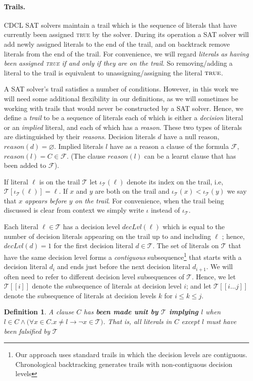 \documentclass[runningheads]{llncs}
\newcommand{\sat}{SAT\xspace}
\newcommand{\trail}{\ensuremath{\mathcal{T}}}
\newcommand{\trailIdxT}[2]{\ensuremath{\iota_{#1}(#2)}}
\newcommand{\range}[2]{#1\ldots#2}
\newcommand{\dlevel}[1]{\ensuremath{\mathit{decLvl}(#1)}}
\newcommand{\true}{\textsc{true}\xspace}
\newcommand{\reason}[1]{\ensuremath{\mathit{reason}(#1)}}
\newcommand{\formula}{\ensuremath{\mathcal{F}}}
\renewcommand{\implies}{\rightarrow}
\newtheorem{defn}{Definition}
\begin{document}
\paragraph{Trails.}
CDCL \sat solvers maintain a trail which is the sequence of literals
that have currently been assigned \true by the solver. During its
operation a \sat solver will add newly assigned literals to the end of
the trail, and on backtrack remove literals from the end of the
trail. For convenience, we will regard \emph{literals as having been
  assigned \true if and only if they are on the trail}. So
removing/adding a literal to the trail is equivalent to
unassigning/assigning the literal $\true$.

A \sat solver's trail satisfies a number of conditions. However, in
this work we will need some additional flexibility in our definitions,
as we will sometimes be working with trails that would never be
constructed by a \sat solver. Hence, we define a \emph{trail} to be a
sequence of literals each of which is either a \emph{decision} literal
or an \emph{implied} literal, and each of which has a
\emph{reason}. These two types of literals are distinguished by their
\emph{reasons}. Decision literals $d$ have a null reason,
$\reason{d} = \varnothing$. Implied literals $l$ have as a reason a
clause of the formula $\formula$, $\reason{l} =
C\in\formula$. (The clause $\reason{l}$ can be a learnt clause that has been
added to $\formula$).

If literal $\ell$ is on the trail $\trail$ let
$\trailIdxT{\trail}{\ell}$ denote its index on the trail, i.e,
$\trail[\trailIdxT{\trail}{\ell}] = \ell$. If $x$ and $y$ are both on
the trail and $\trailIdxT{\trail}{x} < \trailIdxT{\trail}{y}$ we say
that \textit{$x$ appears before $y$ on the trail}. For convenience,
when the trail being discussed is clear from context we simply write
$\iota$ instead of $\iota_{\trail}$.

Each literal $\ell\in\trail$ has a decision level $\dlevel{\ell}$
which is equal to the number of decision literals appearing on the trail
up to and including $\ell$ ; hence, $\dlevel{d}=1$ for the first
decision literal $d\in\trail$. The set of literals on $\trail$ that
have the same decision level forms a \emph{contiguous}
subsequence\footnote{Our approach uses standard trails in which the
  decision levels are contiguous. Chronological backtracking
  \cite{DBLP:conf/lpar/JiangZ13,DBLP:conf/sat/NadelR18,DBLP:conf/sat/MohleB19}
  generates trails with non-contiguous decision levels} that starts
with a decision literal $d_i$ and ends just before the next decision
literal $d_{i+1}$. We will often need to refer to different decision
level subsequences of $\trail$. Hence, we let $\trail[[i]]$ denote the
subsequence of literals at decision level $i$; and let
$\trail[[\range{i}{j}]]$ denote the subsequence of literals at
decision levels $k$ for $i\leq k\leq j$. 
\begin{defn}
    A clause $C$ has \textbf{been made unit by $\trail$ implying $l$}
    when
    $l\in C \land \bigl(\forall x\in C. x\neq l \implies \lnot x \in
    \trail\bigr)$. That is, all literals in $C$ except $l$ must have
    been falsified by $\trail$
\end{defn}
\end{document}
